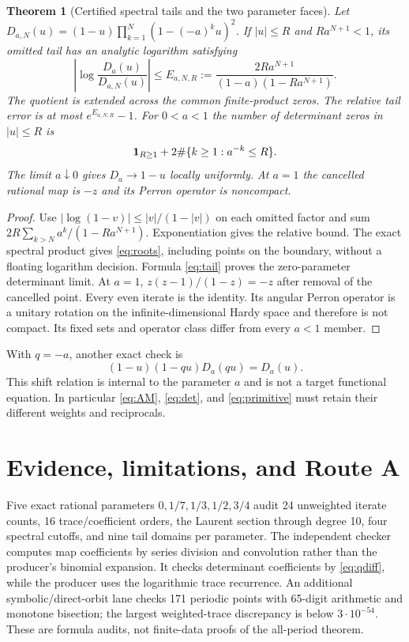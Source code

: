 \documentclass[10pt]{article}
\newtheorem{theorem}{Theorem}
\begin{document}
\begin{theorem}[Certified spectral tails and the two parameter faces]
Let $D_{a,N}(u)=(1-u)\prod_{k=1}^N(1-(-a)^ku)^2$. If $|u|\leq R$
and $Ra^{N+1}<1$, its omitted tail has an analytic logarithm satisfying
\begin{equation}
 \left|\log\frac{D_a(u)}{D_{a,N}(u)}\right|
 \leq E_{a,N,R}:=\frac{2Ra^{N+1}}{(1-a)(1-Ra^{N+1})}. \label{eq:tail}
\end{equation}
The quotient is extended across the common finite-product zeros. The
relative tail error is at most $e^{E_{a,N,R}}-1$. For $0<a<1$ the number
of determinant zeros in $|u|\leq R$ is
\begin{equation}
 {\bf1}_{R\geq1}+2\#\{k\geq1:a^{-k}\leq R\}. \label{eq:roots}
\end{equation}
The limit $a\downarrow0$ gives $D_a\to1-u$ locally uniformly. At $a=1$
the cancelled rational map is $-z$ and its Perron operator is noncompact.
\end{theorem}
\begin{proof}
Use $|\log(1-v)|\leq |v|/(1-|v|)$ on each omitted factor and sum
$2R\sum_{k>N}a^k/(1-Ra^{N+1})$. Exponentiation gives the relative
bound. The exact spectral product gives \eqref{eq:roots}, including points
on the boundary, without a floating logarithm decision. Formula
\eqref{eq:tail} proves the zero-parameter determinant limit. At $a=1$,
$z(z-1)/(1-z)=-z$ after removal of the cancelled point. Every even iterate
is the identity. Its angular Perron operator is a unitary rotation on the
infinite-dimensional Hardy space and therefore is not compact. Its fixed
sets and operator class differ from every $a<1$ member.
\end{proof}

With $q=-a$, another exact check is
\begin{equation}
 (1-u)(1-qu)D_a(qu)=D_a(u). \label{eq:qdiff}
\end{equation}
This shift relation is internal to the parameter $a$ and is not a target
functional equation. In particular \eqref{eq:AM}, \eqref{eq:det}, and
\eqref{eq:primitive} must retain their different weights and reciprocals.

\section{Evidence, limitations, and Route A}

Five exact rational parameters $0,1/7,1/3,1/2,3/4$ audit 24 unweighted
iterate counts, 16 trace/coefficient orders, the Laurent section through
degree 10, four spectral cutoffs, and nine tail domains per parameter.
The independent checker computes map coefficients by series division and
convolution rather than the producer's binomial expansion. It checks
determinant coefficients by \eqref{eq:qdiff}, while the producer uses the
logarithmic trace recurrence. An additional symbolic/direct-orbit lane
checks 171 periodic points with 65-digit arithmetic and monotone bisection;
the largest weighted-trace discrepancy is below $3\cdot10^{-54}$.
These are formula audits, not finite-data proofs of the all-period theorem.
\end{document}
